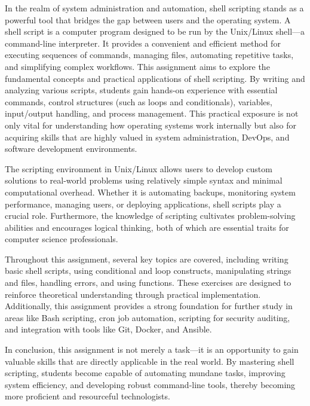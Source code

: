 {
In the realm of system administration and automation, shell scripting stands as a powerful tool that bridges the gap between users and the operating system. A shell script is a computer program designed to be run by the Unix/Linux shell—a command-line interpreter. It provides a convenient and efficient method for executing sequences of commands, managing files, automating repetitive tasks, and simplifying complex workflows.
This assignment aims to explore the fundamental concepts and practical applications of shell scripting. By writing and analyzing various scripts, students gain hands-on experience with essential commands, control structures (such as loops and conditionals), variables, input/output handling, and process management. This practical exposure is not only vital for understanding how operating systems work internally but also for acquiring skills that are highly valued in system administration, DevOps, and software development environments.

The scripting environment in Unix/Linux allows users to develop custom solutions to real-world problems using relatively simple syntax and minimal computational overhead. Whether it is automating backups, monitoring system performance, managing users, or deploying applications, shell scripts play a crucial role. Furthermore, the knowledge of scripting cultivates problem-solving abilities and encourages logical thinking, both of which are essential traits for computer science professionals.

Throughout this assignment, several key topics are covered, including writing basic shell scripts, using conditional and loop constructs, manipulating strings and files, handling errors, and using functions. These exercises are designed to reinforce theoretical understanding through practical implementation. Additionally, this assignment provides a strong foundation for further study in areas like Bash scripting, cron job automation, scripting for security auditing, and integration with tools like Git, Docker, and Ansible.

In conclusion, this assignment is not merely a task—it is an opportunity to gain valuable skills that are directly applicable in the real world. By mastering shell scripting, students become capable of automating mundane tasks, improving system efficiency, and developing robust command-line tools, thereby becoming more proficient and resourceful technologists.
}
